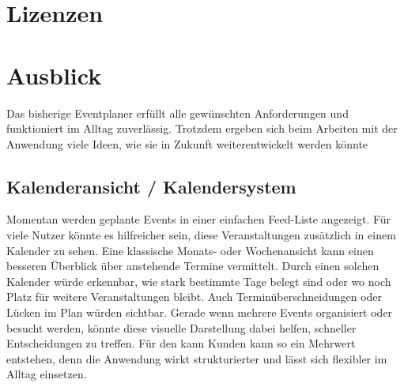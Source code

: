 \documentclass[a4paper,12pt]{article}
\begin{document}
\newpage


\section{Lizenzen}

\newpage


\section{Ausblick}

Das bisherige Eventplaner erfüllt alle gewünschten Anforderungen und funktioniert im Alltag zuverlässig. Trotzdem ergeben sich beim Arbeiten mit der Anwendung viele Ideen, wie sie in Zukunft weiterentwickelt werden könnte


\subsection{Kalenderansicht / Kalendersystem}

Momentan werden geplante Events in einer einfachen Feed-Liste angezeigt. Für viele Nutzer könnte es hilfreicher sein, diese Veranstaltungen zusätzlich in einem Kalender zu sehen. Eine klassische Monats- oder Wochenansicht kann einen besseren Überblick über anstehende Termine vermittelt. Durch einen solchen Kalender würde erkennbar, wie stark bestimmte Tage belegt sind oder wo noch Platz für weitere Veranstaltungen bleibt. Auch Terminüberschneidungen oder Lücken im Plan würden sichtbar. Gerade wenn mehrere Events organisiert oder besucht werden, könnte diese visuelle Darstellung dabei helfen, schneller Entscheidungen zu treffen. Für den kann Kunden kann so ein Mehrwert entstehen, denn die Anwendung wirkt strukturierter und lässt sich flexibler im Alltag einsetzen.
\end{document}
